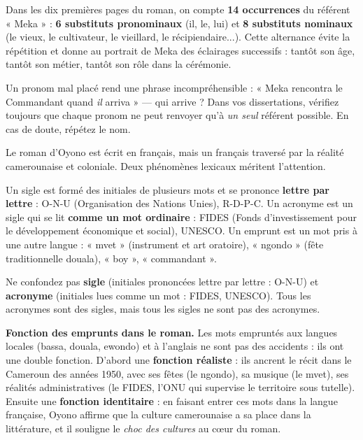 \documentclass[11pt]{article}
\newcommand{\cle}[1]{{\popxbold\color{popdark}#1}}
\newcounter{popsec}
\newcounter{popsub}
\newcommand{\courssub}[1]{%
  \stepcounter{popsub}%
  \par\vspace{9pt}\noindent{\popxbold\fontsize{11.5}{13}\selectfont\color{popink}{\color{poporange}\thepopsec.\thepopsub}\hspace{6pt}#1}\par\nopagebreak\vspace{4pt}
}
\begin{document}
\begin{exemplebox}
Dans les dix premières pages du roman, on compte \textbf{14 occurrences} du référent « Meka » : \textbf{6 substituts pronominaux} (il, le, lui) et \textbf{8 substituts nominaux} (le vieux, le cultivateur, le vieillard, le récipiendaire...). Cette alternance évite la répétition et donne au portrait de Meka des éclairages successifs : tantôt son âge, tantôt son métier, tantôt son rôle dans la cérémonie.
\end{exemplebox}

\begin{attention}
Un pronom mal placé rend une phrase incompréhensible : « Meka rencontra le Commandant quand \emph{il} arriva » — qui arrive ? Dans vos dissertations, vérifiez toujours que chaque pronom ne peut renvoyer qu'à \emph{un seul} référent possible. En cas de doute, répétez le nom.
\end{attention}

\courssub{Outil de langue n°2 : sigles et emprunts}

Le roman d'Oyono est écrit en français, mais un français traversé par la réalité camerounaise et coloniale. Deux phénomènes lexicaux méritent l'attention.

\begin{definition}
Un \cle{sigle} est formé des initiales de plusieurs mots et se prononce \textbf{lettre par lettre} : O-N-U (Organisation des Nations Unies), R-D-P-C. Un \cle{acronyme} est un sigle qui se lit \textbf{comme un mot ordinaire} : FIDES (Fonds d'investissement pour le développement économique et social), UNESCO. Un \cle{emprunt} est un mot pris à une autre langue : « mvet » (instrument et art oratoire), « ngondo » (fête traditionnelle douala), « boy », « commandant ».
\end{definition}

\begin{attention}
Ne confondez pas \textbf{sigle} (initiales prononcées lettre par lettre : O-N-U) et \textbf{acronyme} (initiales lues comme un mot : FIDES, UNESCO). Tous les acronymes sont des sigles, mais tous les sigles ne sont pas des acronymes.
\end{attention}

\textbf{Fonction des emprunts dans le roman.} Les mots empruntés aux langues locales (bassa, douala, ewondo) et à l'anglais ne sont pas des accidents : ils ont une double fonction. D'abord une \textbf{fonction réaliste} : ils ancrent le récit dans le Cameroun des années 1950, avec ses fêtes (le ngondo), sa musique (le mvet), ses réalités administratives (le FIDES, l'ONU qui supervise le territoire sous tutelle). Ensuite une \textbf{fonction identitaire} : en faisant entrer ces mots dans la langue française, Oyono affirme que la culture camerounaise a sa place dans la littérature, et il souligne le \emph{choc des cultures} au cœur du roman.
\end{document}
